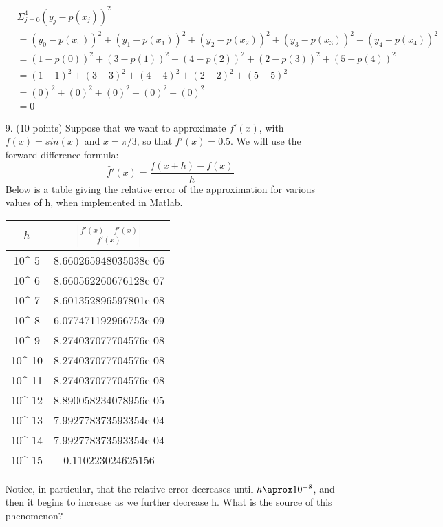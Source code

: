 \documentclass{article}
\begin{document}
\begin{enumerate}
    \begin{align*}
        & \Sigma^4_{j=0}(y_j-p(x_j))^2 \\
        &= (y_0-p(x_0))^2 + (y_1-p(x_1))^2 + (y_2-p(x_2))^2 + (y_3-p(x_3))^2 + (y_4-p(x_4))^2 \\
        &= (1-p(0))^2 + (3-p(1))^2 + (4-p(2))^2 + (2-p(3))^2 + (5-p(4))^2 \\
        &= (1-1)^2 + (3-3)^2 + (4-4)^2 + (2-2)^2 + (5-5)^2 \\
        &= (0)^2 + (0)^2 + (0)^2 + (0)^2 + (0)^2 \\
        &= 0
    \end{align*}
    \newpage
    \item[9.] (10 points) Suppose that we want to approximate $f'(x)$, with $f(x) = sin(x)$ and $x = \pi/3$, so that $f'(x) = 0.5$.\newline
    We will use the forward difference formula:
    \[\hat{f}'(x)=\frac{f(x+h)-f(x)}{h}\]
    Below is a table giving the relative error of the approximation for various values of h, when implemented in Matlab.\newline\newline
    \begin{tabular}{ c|c } 
        $h$ & $\left|\frac{f'(x) - \hat{f}'(x)}{f'(x)}\right|$ \\ 
        \hline
        10^{-5} & 8.660265948035038e-06\\
        10^{-6} & 8.660562260676128e-07\\
        10^{-7} & 8.601352896597801e-08\\
        10^{-8} & 6.077471192966753e-09\\
        10^{-9} & 8.274037077704576e-08\\
        10^{-10} & 8.274037077704576e-08\\
        10^{-11} & 8.274037077704576e-08\\
        10^{-12} & 8.890058234078956e-05\\
        10^{-13} & 7.992778373593354e-04\\
        10^{-14} & 7.992778373593354e-04\\
        10^{-15} & 0.110223024625156\\
    \end{tabular}\newline
    Notice, in particular, that the relative error decreases until $h \aprox 10^{-8}$, and then it begins to increase as we further decrease h. What is the source of this phenomenon?
    \begin{enumerate}

\end{enumerate}
\end{enumerate}
\end{document}
